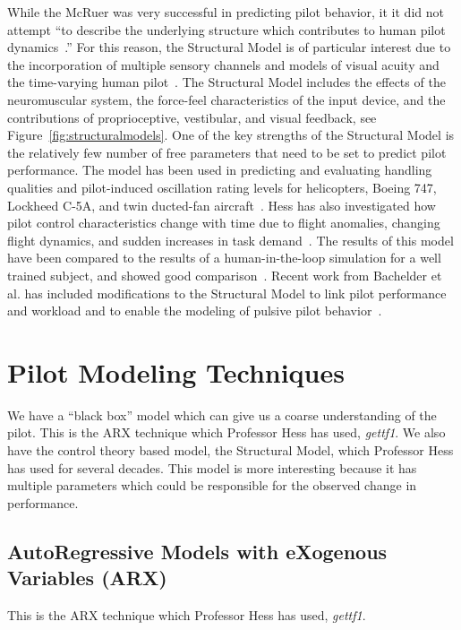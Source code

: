 While the McRuer was very successful in predicting pilot behavior, it it did not attempt ``to describe the underlying structure which contributes to human pilot dynamics~\cite{hess_structural_1980}.''
For this reason, the Structural Model is of particular interest due to the incorporation of multiple sensory channels and models of visual acuity and the time-varying human pilot~\cite{hess_modeling_2009}.
The Structural Model includes the effects of the neuromuscular system, the force-feel characteristics of the input device, and the contributions of proprioceptive, vestibular, and visual feedback, see Figure~\ref{fig:structuralmodels}.
One of the key strengths of the Structural Model is the relatively few number of free parameters that need to be set to predict pilot performance.
The model has been used in predicting and evaluating handling qualities and pilot-induced oscillation rating levels for helicopters, Boeing 747, Lockheed C-5A, and twin ducted-fan aircraft~\cite{hess_analytical_2013,andreea-irina_prediction_2014,grant_handling_2015}.
Hess has also investigated how pilot control characteristics change with time due to flight anomalies, changing flight dynamics, and sudden increases in task demand~\cite{hess_modeling_2009,hess_modeling_2016}.
The results of this model have been compared to the results of a human-in-the-loop simulation for a well trained subject, and showed good comparison~\cite{hess_modeling_2016}.
Recent work from Bachelder et al. has included modifications to the Structural Model to link pilot performance and workload and to enable the modeling of pulsive pilot behavior~\cite{bachelder_modeling_2017,bachelder_linking_2018}.

\section{Pilot Modeling Techniques}
We have a ``black box'' model which can give us a coarse understanding of the pilot.
This is the ARX technique which Professor Hess has used, \textit{gettf1}.
We also have the control theory based model, the Structural Model, which Professor Hess has used for several decades.
This model is more interesting because it has multiple parameters which could be responsible for the observed change in performance.

\subsection{AutoRegressive Models with eXogenous Variables (ARX)}
This is the ARX technique which Professor Hess has used, \textit{gettf1}.

